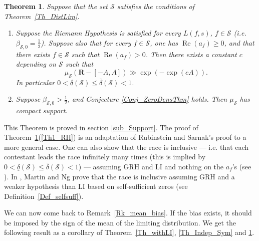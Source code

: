 \documentclass[a4paper,10pt]{amsart}
\theoremstyle{plain}
\newtheorem{theo}{Theorem}[section]
\theoremstyle{definition}
\begin{document}
\begin{theo}\label{Th_withRH}
Suppose that the set $\mathcal{S}$ satisfies the conditions of Theorem~\ref{Th_DistLim}.
\begin{enumerate}
\item\label{Th1_RH} Suppose the Riemann Hypothesis is satisfied for every $L(f,s)$, $f\in\mathcal{S}$ 
(\textit{i.e.} $\beta_{\mathcal{S},0}=\frac{1}{2}$).
Suppose also that for every $f\in \mathcal{S}$, one has $\operatorname{Re}(a_{f})\geq 0$, and that there exists $f\in\mathcal{S}$ such that $\operatorname{Re}(a_{f})> 0$.
Then there exists a constant $c$ depending on $\mathcal{S}$ such that
$$\mu_{\mathcal{S}}(\mathbf{R}-[-A,A]) \gg \exp(-\exp(cA)).$$
In particular
$0< \underline{\delta}(\mathcal{S}) \leq \overline{\delta}(\mathcal{S}) <1$.
\item\label{Th2_nRH} Suppose $\beta_{\mathcal{S},0}>\frac{1}{2}$, 
and Conjecture \ref{Conj_ZeroDensThm} holds.
Then $\mu_{\mathcal{S}}$ has compact support.
\end{enumerate}
\end{theo}
This Theorem is proved in section \ref{sub_Support}.
The proof of Theorem~\ref{Th_withRH}(\ref{Th1_RH}) is an adaptation of Rubinstein and Sarnak's proof to a more general case.
One can also show that the race is inclusive --- i.e. that each contestant leads the race infinitely many times 
(this is implied by $0< \underline{\delta}(\mathcal{S}) \leq \overline{\delta}(\mathcal{S}) <1$) ---
 assuming GRH and LI and nothing on the $a_{f}$'s (see \cite{RS}).
In \cite{MartinNg}, Martin and Ng prove that the race is inclusive assuming GRH and a weaker hypothesis than LI based on self-sufficient zeros (see Definition~\ref{Def_selfsuff}).

We can now come back to Remark~\ref{Rk_mean_bias}. 
If the bias exists, it should be imposed by the sign of the mean of the limiting distribution.
We get the following result as a corollary of Theorem~\ref{Th_withLI}, \ref{Th_Indep_Sym} and \ref{Th_withRH}.
\end{document}
